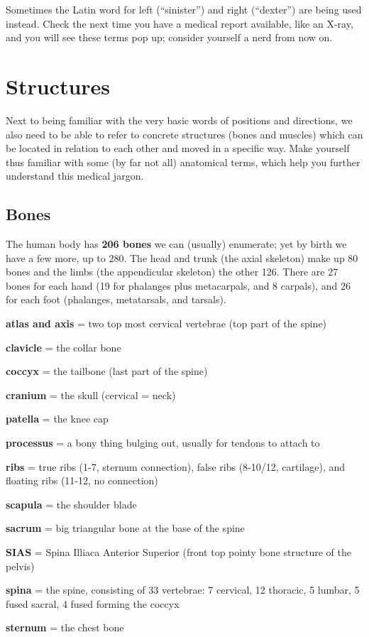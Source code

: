 Sometimes the Latin word for left (``sinister'') and right (``dexter'') are being used instead.
Check the next time you have a medical report available, like an X-ray, and you will see these terms pop up; consider yourself a nerd from now on.

\section{Structures}\label{sec:structures}

Next to being familiar with the very basic words of positions and directions, we also need to be able to refer to concrete structures (bones and muscles) which can be located in relation to each other and moved in a specific way.
Make yourself thus familiar with some (by far not all) anatomical terms, which help you further understand this medical jargon.

\subsection{Bones}\label{subsec:bones}

The human body has \textbf{206 bones} we can (usually) enumerate; yet by birth we have a few more, up to 280.
The head and trunk (the axial skeleton) make up 80 bones and the limbs (the appendicular skeleton) the other 126.
There are 27 bones for each hand (19 for phalanges plus metacarpals, and 8 carpals), and 26 for each foot (phalanges, metatarsals, and tarsals).

\begin{itemize*}
    \item \textbf{atlas and axis} = two top most cervical vertebrae (top part of the spine)
    \item \textbf{clavicle} = the collar bone
    \item \textbf{coccyx} = the tailbone (last part of the spine)
    \item \textbf{cranium} = the skull (cervical = neck)
    \item \textbf{patella} = the knee cap
    \item \textbf{processus} = a bony thing bulging out, usually for tendons to attach to
    \item \textbf{ribs} = true ribs (1-7, sternum connection), false ribs (8-10/12, cartilage), and floating ribs (11-12, no connection)
    \item \textbf{scapula} = the shoulder blade
    \item \textbf{sacrum} = big triangular bone at the base of the spine
    \item \textbf{SIAS} = Spina Illiaca Anterior Superior (front top pointy bone structure of the pelvis)
    \item \textbf{spina} = the spine, consisting of 33 vertebrae: 7 cervical, 12 thoracic, 5 lumbar, 5 fused sacral, 4 fused forming the coccyx
    \item \textbf{sternum} = the chest bone
\end{itemize*}

